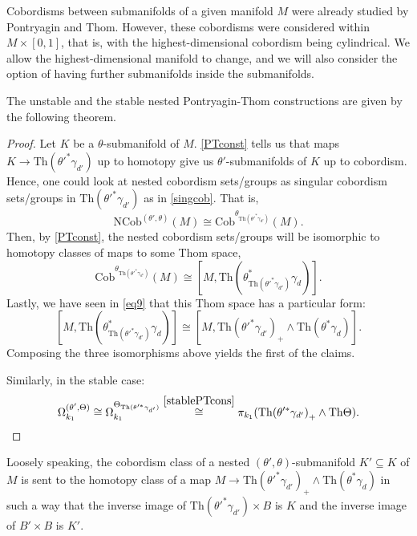 \documentclass[a4paper, 11pt,reqno]{amsart}
\theoremstyle{plain}
\newtheorem{theorem}{Theorem}[section]
\theoremstyle{definition}
\newcommand{\Th}{\mathrm{Th}}
\begin{document}
Cobordisms between submanifolds of a given manifold $M$ were already studied by Pontryagin and Thom. However, these cobordisms were considered within $M\times [0,1]$, that is, with the highest-dimensional cobordism being cylindrical. We allow the highest-dimensional manifold to change, and we will also consider the option of having further submanifolds inside the submanifolds.\par
The unstable and the stable nested Pontryagin-Thom constructions are given by the following theorem.
\begin{proof} Let $K$ be a $\theta$-submanifold of $M$. \cref{PTconst} tells us that maps $K\to \Th(\theta'^\ast\gamma_{d'})$ up to homotopy give us $\theta'$-submanifolds of $K$ up to cobordism. Hence, one could look at nested cobordism sets/groups as singular cobordism sets/groups in $\Th(\theta'^\ast\gamma_{d'})$ as in \cref{singcob}. That is,
\[
    \mathrm{NCob}^{(\theta',\theta)}(M)\cong\mathrm{Cob}^{\theta_{\Th(\theta'^\ast\gamma_{d'})}}(M).\]
Then, by \cref{PTconst}, the nested cobordism sets/groups will be isomorphic to homotopy classes of maps to some Thom space,
\[\mathrm{Cob}^{\theta_{\Th(\theta'^\ast\gamma_{d'})}}(M)\cong[M, \Th(\theta_{\Th(\theta'^\ast\gamma_{d'})}^\ast\gamma_{d})].\]
Lastly, we have seen in \eqref{eq9} that this Thom space has a particular form:
 \[[M, \Th(\theta_{\Th(\theta'^\ast\gamma_{d'})}^\ast\gamma_{d})]\cong[M,{\Th(\theta'^\ast\gamma_{d'})}_+\wedge \Th(\theta^\ast\gamma_{d})].\]
Composing the three isomorphisms above yields the first of the claims.\par
Similarly, in the stable case:
\[\Omega_{k_1}^{(\theta',\Theta)}\cong\Omega_{k_1}^{\Theta_{\Th(\theta'^\ast\gamma_{d'})}}\stackrel{\ref{stablePTcons}}{\cong}\pi_{k_1}({\Th(\theta'^\ast\gamma_{d'})}_+\wedge \Th\Theta).\qedhere\] 
\end{proof}
Loosely speaking, the cobordism class of a nested $(\theta',\theta)$-submanifold $K'\subseteq K$ of $M$ is sent to the homotopy class of a map $M\to \Th(\theta'^\ast\gamma_{d'})_+\wedge \Th(\theta^\ast\gamma_{d})$ in such a way that the inverse image of $\Th(\theta'^\ast\gamma_{d'})\times B$ is $K$ and the inverse image of $B'\times B$ is $K'$.\par 
\end{document}
